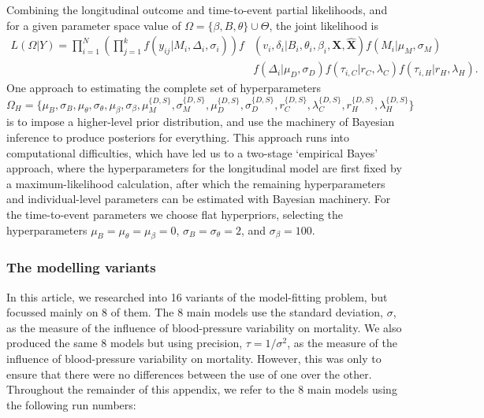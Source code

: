 \documentclass[
]{article}
\begin{document}
Combining the longitudinal outcome and time-to-event partial likelihoods, and for a given parameter space value of \(\Omega=\{\beta,B,\theta\}\cup \Theta\), the joint likelihood is
\begin{equation}
\begin{split}
  L(\Omega|Y)=\prod_{i=1}^N\left(\prod_{j=1}^{k}f(y_{ij}|M_i,\Delta_i,\sigma_i)\right)f&(v_i,\delta_i|B_i,\theta_i,\beta_i,\boldsymbol{X},\hat{\boldsymbol{X}})f(M_i|\mu_M,\sigma_M)\\
  &f(\Delta_i|\mu_D,\sigma_D)f(\tau_{i,C}|r_C,\lambda_C)f(\tau_{i,H}|r_H,\lambda_H).
  \end{split}
\end{equation}
One approach to estimating the complete set of hyperparameters
\begin{equation}
  \Omega_H=\{\mu_B,\sigma_B,\mu_\theta,\sigma_\theta,\mu_\beta,\sigma_\beta,\mu_M^{\{D,S\}},\sigma_M^{\{D,S\}},\mu_D^{\{D,S\}},\sigma_D^{\{D,S\}},r_C^{\{D,S\}},\lambda_C^{\{D,S\}},r_H^{\{D,S\}},\lambda_H^{\{D,S\}}\}
\end{equation}
is to impose a higher-level prior distribution, and use the machinery of Bayesian inference to produce posteriors for everything.
This approach runs into computational difficulties, which have led us to a two-stage `empirical Bayes' approach, where the hyperparameters for the longitudinal model are first fixed by a maximum-likelihood calculation, after which the remaining hyperparameters and individual-level parameters can be estimated with Bayesian machinery.
For the time-to-event parameters we choose flat hyperpriors, selecting the hyperparameters \(\mu_B=\mu_\theta=\mu_\beta=0\), \(\sigma_B=\sigma_\theta=2\), and \(\sigma_\beta=100\).

\hypertarget{the-modelling-variants}{%
\subsubsection{The modelling variants}\label{the-modelling-variants}}

In this article, we researched into 16 variants of the model-fitting problem, but focussed mainly on 8 of them.
The 8 main models use the standard deviation, \(\sigma\), as the measure of the influence of blood-pressure variability on mortality.
We also produced the same 8 models but using precision, \(\tau=1/\sigma^2\), as the measure of the influence of blood-pressure variability on mortality.
However, this was only to ensure that there were no differences between the use of one over the other.
Throughout the remainder of this appendix, we refer to the 8 main models using the following run numbers:
\end{document}
